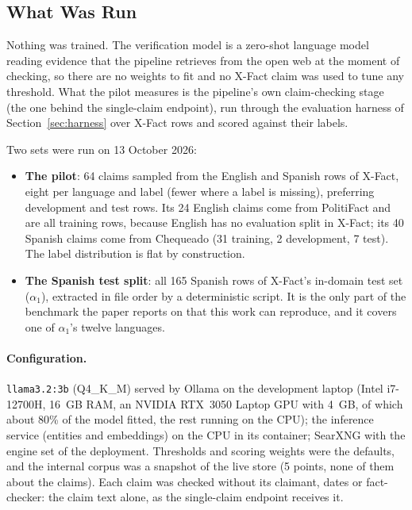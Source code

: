 
\subsection{What Was Run}
\label{subsec:pilot-setup}

Nothing was trained. The verification model is a zero-shot language
model reading evidence that the pipeline retrieves from the open web
at the moment of checking, so there are no weights to fit and no
X-Fact claim was used to tune any threshold. What the pilot measures
is the pipeline's own claim-checking stage (the one behind the
single-claim endpoint), run through the evaluation harness of
Section~\ref{sec:harness} over X-Fact rows and scored against their
labels.

Two sets were run on 13 October 2026:

\begin{itemize}
    \item \textbf{The pilot}: 64 claims sampled from the English and
    Spanish rows of X-Fact, eight per language and label (fewer where
    a label is missing), preferring development and test rows. Its 24
    English claims come from PolitiFact and are all training rows,
    because English has no evaluation split in X-Fact; its 40 Spanish
    claims come from Chequeado (31 training, 2 development, 7 test).
    The label distribution is flat by construction.
    \item \textbf{The Spanish test split}: all 165 Spanish rows of
    X-Fact's in-domain test set ($\alpha_1$), extracted in file order
    by a deterministic script. It is the only part of the benchmark
    the paper reports on that this work can reproduce, and it covers
    one of $\alpha_1$'s twelve languages.
\end{itemize}

\paragraph{Configuration.} \texttt{llama3.2:3b} (Q4\_K\_M) served by
Ollama on the development laptop (Intel i7-12700H, 16~GB RAM, an
NVIDIA RTX~3050 Laptop GPU with 4~GB, of which about 80\% of the model
fitted, the rest running on the CPU); the inference service (entities
and embeddings) on the CPU in its container; SearXNG with the engine
set of the deployment. Thresholds and scoring weights were the
defaults, and the internal corpus was a snapshot of the live store
(5 points, none of them about the claims). Each claim was checked
without its claimant, dates or fact-checker: the claim text alone, as
the single-claim endpoint receives it.

